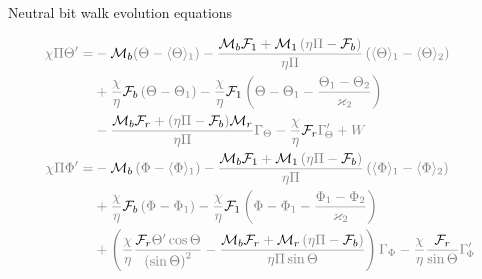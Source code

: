 \documentclass{beamer}
\begin{document}
\begin{frame}{Neutral bit walk evolution equations}
\begin{itemize}
\begin{equation}
\begin{aligned}
			\color{gray}\chi \Pi \Theta ' =  &\color{gray}- \color{black}\mathcal{M}_b\color{gray}(\Theta-\langle\Theta \rangle_1)-\frac{{{\color{black}\mathcal{M}_b\color{gray}}{\color{black}\mathcal{F}_1\color{gray}} + {\color{black}\mathcal{M}_1\color{gray}}\left( {\eta \Pi  - {\color{black}\mathcal{F}_b\color{gray}}} \right)}}{{\eta \Pi }}\left( {{\langle{\Theta} \rangle_1} - {\langle{\Theta} \rangle_{2}}} \right)
			\\
			&\color{gray}+\frac{\chi }{\eta }{\color{black}\mathcal{F}_b\color{gray}}\left( {{\Theta} - {{\Theta}_1}} \right)
			- \frac{\chi }{\eta }{\color{black}\mathcal{F}_1\color{gray}}\left( {{{{{\Theta}} - {{\Theta}_1}}} - \frac{{{{\Theta}_1} - {{\Theta}_{2}}}}{{{\varkappa _{2}}}}} \right)
			\\
			&\color{gray}- \frac{{{\color{black}\mathcal{M}_b\color{gray}}{\color{black}\mathcal{F}_r\color{gray}} + (\eta \Pi  - {\color{black}\mathcal{F}_b\color{gray}}){\color{black}\mathcal{M}_r\color{gray}}}}{{\eta \Pi }}{\Gamma _{\Theta}} - \frac{\chi }{\eta }{\color{black}\mathcal{F}_r\color{gray}}\Gamma_{\!\Theta}' + W
			\\
			\color{gray}\chi \Pi \Phi ' =  &\color{gray}- {\color{black}\mathcal{M}_b\color{gray}}\left( {\Phi  - {\langle{\Phi} \rangle_1}} \right)-\frac{{{\color{black}\mathcal{M}_b\color{gray}}{\color{black}\mathcal{F}_1\color{gray}} + {\color{black}\mathcal{M}_1\color{gray}}\left( {\eta \Pi  - {\color{black}\mathcal{F}_b\color{gray}}} \right)}}{{\eta \Pi }}\left( {{\langle{\Phi} \rangle_1} - {\langle{\Phi} \rangle_{2}}} \right)
			\\
			&\color{gray}+\frac{\chi }{\eta }{\color{black}\mathcal{F}_b\color{gray}}\left( {{\Phi} - {{\Phi}_1}} \right)
			- \frac{\chi }{\eta }{\color{black}\mathcal{F}_1\color{gray}}\left( {{{{{\Phi}} - {{\Phi}_1}}} - \frac{{{{\Phi}_1} - {{\Phi}_{2}}}}{{{\varkappa _{2}}}}} \right)
			\\
			&\color{gray}+ \left( {\frac{\chi }{\eta }\frac{{{\color{black}\mathcal{F}_r\color{gray}}\Theta '\cos \Theta }}{{{{\left( {\sin \Theta } \right)}^2}}} - \frac{{{\color{black}\mathcal{M}_b\color{gray}}{\color{black}\mathcal{F}_r\color{gray}} + {\color{black}\mathcal{M}_r\color{gray}}\left( {\eta \Pi  - {\color{black}\mathcal{F}_b\color{gray}}} \right)}}{{\eta \Pi \sin \Theta }}} \right){\Gamma _{\Phi}} - \frac{\chi }{\eta }\frac{{{\color{black}\mathcal{F}_r\color{gray}}}}{{\sin \Theta }}\Gamma_{\!\Phi}'
			\end{aligned}
			\nonumber
			\end{equation}
		\\

\end{itemize}
\end{frame}
\end{document}

